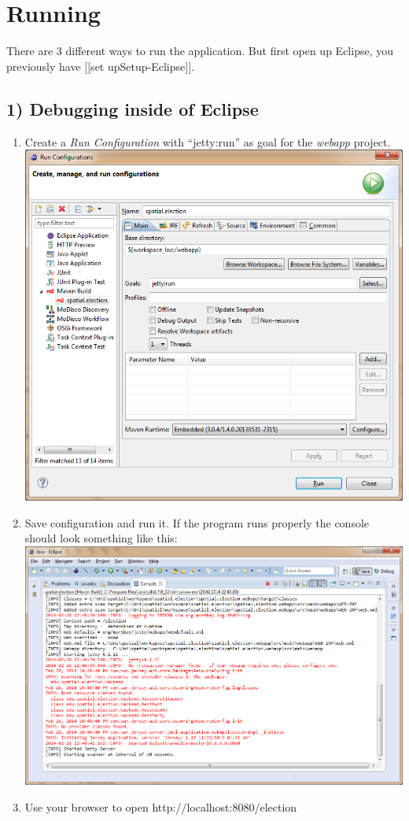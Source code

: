
\section{Running}


There are 3 different ways to run the application. But first open up
Eclipse, you previously have {[}{[}set up\textbar{}Setup-Eclipse{]}{]}.

\subsection{1) Debugging inside of
Eclipse}\label{debugging-inside-of-eclipse}

\begin{enumerate}
\def\labelenumi{\arabic{enumi}.}
\item
  Create a \emph{Run Configuration} with ``jetty:run'' as goal for the
  \emph{webapp} project.
  \includegraphics[width=1.1\textwidth]{../img/dwACYmd.png}
\item
  Save configuration and run it. If the program runs properly the
  console should look something like this:
  \includegraphics[width=1.1\textwidth]{../img/UZXVJIp.png}
\item
  Use your browser to open http://localhost:8080/election
\end{enumerate}

